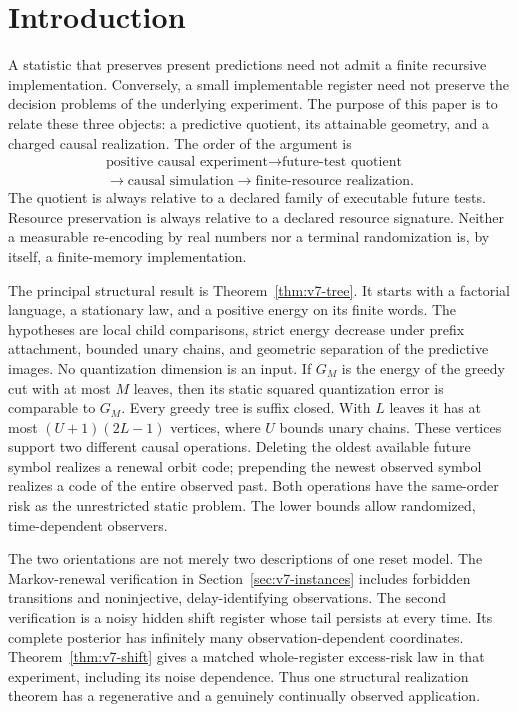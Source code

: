 \section{Introduction}\label{sec:v7-introduction}
A statistic that preserves present predictions need not admit a finite
recursive implementation. Conversely, a small implementable register
need not preserve the decision problems of the underlying experiment.
The purpose of this paper is to relate these three objects: a predictive
quotient, its attainable geometry, and a charged causal realization.
The order of the argument is
\[
 \begin{gathered}
 \text{positive causal experiment}\longrightarrow\text{future-test quotient}\\
 \longrightarrow\text{causal simulation}\longrightarrow\text{finite-resource realization}.
 \end{gathered}
\]
The quotient is always relative to a declared family of executable future
tests. Resource preservation is always relative to a declared resource
signature. Neither a measurable re-encoding by real numbers nor a
terminal randomization is, by itself, a finite-memory implementation.

The principal structural result is Theorem~\ref{thm:v7-tree}. It starts
with a factorial language, a stationary law, and a positive energy on its
finite words. The hypotheses are local child comparisons, strict energy
decrease under prefix attachment, bounded unary chains, and geometric
separation of the predictive images. No quantization dimension is an
input. If $G_M$ is the energy of the greedy cut with at most $M$ leaves,
then its static squared quantization error is comparable to $G_M$.
Every greedy tree is suffix closed. With $L$ leaves it has at most
$(U+1)(2L-1)$ vertices, where $U$ bounds unary chains. These vertices
support two different causal operations. Deleting the oldest available
future symbol realizes a renewal orbit code; prepending the newest
observed symbol realizes a code of the entire observed past. Both
operations have the same-order risk as the unrestricted static problem.
The lower bounds allow randomized, time-dependent observers.

The two orientations are not merely two descriptions of one reset model.
The Markov-renewal verification in Section~\ref{sec:v7-instances} includes
forbidden transitions and noninjective, delay-identifying observations.
The second verification is a noisy hidden shift register whose tail
persists at every time. Its complete posterior has infinitely many
observation-dependent coordinates. Theorem~\ref{thm:v7-shift} gives a
matched whole-register excess-risk law in that experiment, including its
noise dependence. Thus one structural realization theorem has a
regenerative and a genuinely continually observed application.

